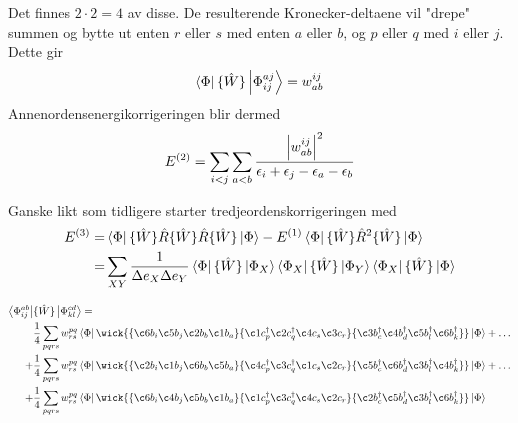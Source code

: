 \documentclass{beamer}
\begin{document}
\begin{frame}
	Det finnes $2\cdot2=4$ av disse. De resulterende Kronecker-deltaene vil "drepe" summen og bytte ut enten $r$ eller $s$ med enten $a$ eller $b$, og $p$ eller $q$ med $i$ eller $j$. Dette gir
	\begin{equation}
		\bra{\Phi} \{\hat W\}\ket{\Phi_{ij}^{aj}} = w_{ab}^{ij}
	\end{equation}
	Annenordensenergikorrigeringen blir dermed
	\begin{equation}
		E^{(2)} = \sum_{i<j}\sum_{a<b} \frac{\abs{w_{ab}^{ij}}^2}{\epsilon_i + \epsilon_j - \epsilon_a - \epsilon_b}
	\end{equation}
\end{frame}

\begin{frame}
	Ganske likt som tidligere starter tredjeordenskorrigeringen med
	\begin{align}
		E^{(3)} =& \bra{\Phi} \{\hat W\} \hat R \{\hat W\} \hat R \{\hat W\} \ket{\Phi} - E^{(1)} \bra{\Phi}\{\hat W\} \hat R^2 \{\hat W\} \ket{\Phi} \\
				=& \sum_{XY} \frac{1}{\Delta e_X \Delta e_Y} \bra{\Phi} \{\hat W\} \ket{\Phi_X} \bra{\Phi_X} \{\hat W\} \ket{\Phi_Y} \bra{\Phi_X} \{\hat W\} \ket{\Phi}
	\end{align}
\end{frame}

\begin{frame}
	\begin{align*}
		\bra{\Phi_{ij}^{ab}}& \{\hat W \} \ket{\Phi_{kl}^{cd}} = \\
			 &\frac{1}{4}\sum_{pqrs} w_{rs}^{pq} \bra{\Phi}
			 \wick{			 
			 \{\c6 b_i \c5 b_j \c2 b_b \c1 b_a \} \{ \c1 c^\dagger_p \c2 c^\dagger_q \c4 c_s \c3 c_r \} \{\c3 b^\dagger_c \c4 b^\dagger_d \c5 b^\dagger_l \c6 b^\dagger_k \} 
			}	 		 
			\ket{\Phi} + \dots \\
		+&\frac{1}{4}\sum_{pqrs} w_{rs}^{pq} \bra{\Phi}
		\wick{			 
			 \{\c2 b_i \c1 b_j  \c6 b_b  \c5 b_a \} \{\c4 c^\dagger_p \c3 c^\dagger_q \c1 c_s \c2 c_r \} \{  \c5 b^\dagger_c \c6  b^\dagger_d \c3 b^\dagger_l \c4 b^\dagger_k \} 
			}
			\ket{\Phi} + \dots \\
		+&\frac{1}{4}\sum_{pqrs} w_{rs}^{pq} \bra{\Phi}
		\wick{			 
			 \{\c6 b_i \c4 b_j   \c5 b_b  \c1 b_a \} \{ \c1 c^\dagger_p  \c3 c^\dagger_q \c4 c_s \c2 c_r \} \{ \c2 b^\dagger_c  \c5 b^\dagger_d \c3 b^\dagger_l \c6 b^\dagger_k \} 
			}
			\ket{\Phi}
	\end{align*}
\end{frame}
\end{document}
